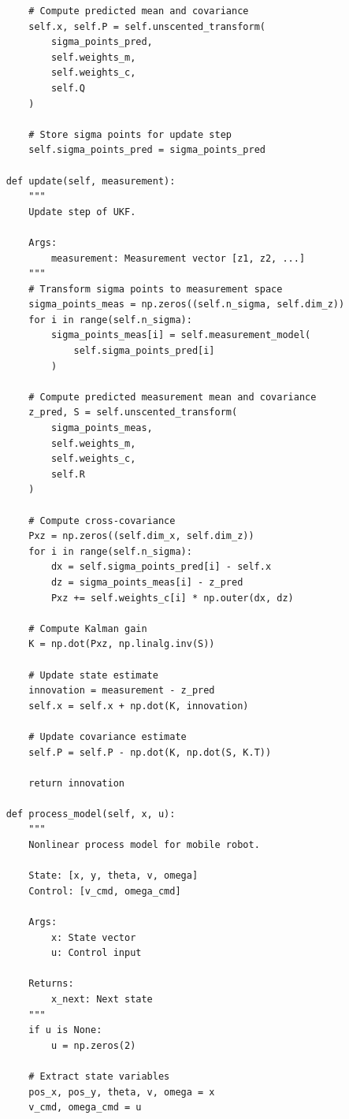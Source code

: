 \begin{lstlisting}
        # Compute predicted mean and covariance
        self.x, self.P = self.unscented_transform(
            sigma_points_pred,
            self.weights_m,
            self.weights_c,
            self.Q
        )
        
        # Store sigma points for update step
        self.sigma_points_pred = sigma_points_pred
    
    def update(self, measurement):
        """
        Update step of UKF.
        
        Args:
            measurement: Measurement vector [z1, z2, ...]
        """
        # Transform sigma points to measurement space
        sigma_points_meas = np.zeros((self.n_sigma, self.dim_z))
        for i in range(self.n_sigma):
            sigma_points_meas[i] = self.measurement_model(
                self.sigma_points_pred[i]
            )
        
        # Compute predicted measurement mean and covariance
        z_pred, S = self.unscented_transform(
            sigma_points_meas,
            self.weights_m,
            self.weights_c,
            self.R
        )
        
        # Compute cross-covariance
        Pxz = np.zeros((self.dim_x, self.dim_z))
        for i in range(self.n_sigma):
            dx = self.sigma_points_pred[i] - self.x
            dz = sigma_points_meas[i] - z_pred
            Pxz += self.weights_c[i] * np.outer(dx, dz)
        
        # Compute Kalman gain
        K = np.dot(Pxz, np.linalg.inv(S))
        
        # Update state estimate
        innovation = measurement - z_pred
        self.x = self.x + np.dot(K, innovation)
        
        # Update covariance estimate
        self.P = self.P - np.dot(K, np.dot(S, K.T))
        
        return innovation
    
    def process_model(self, x, u):
        """
        Nonlinear process model for mobile robot.
        
        State: [x, y, theta, v, omega]
        Control: [v_cmd, omega_cmd]
        
        Args:
            x: State vector
            u: Control input
            
        Returns:
            x_next: Next state
        """
        if u is None:
            u = np.zeros(2)
        
        # Extract state variables
        pos_x, pos_y, theta, v, omega = x
        v_cmd, omega_cmd = u
        

\end{lstlisting}
